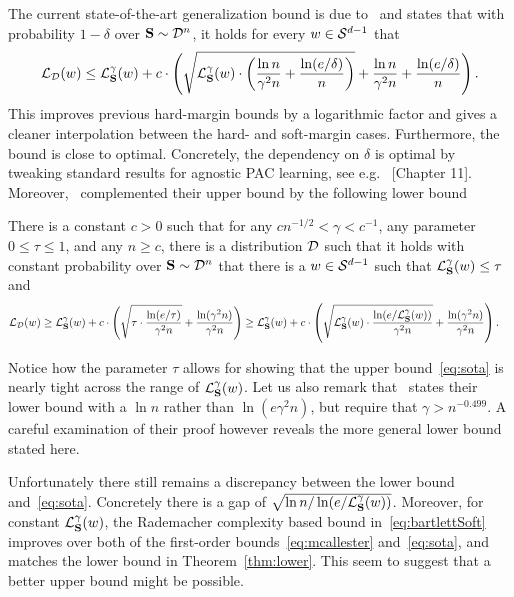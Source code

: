 The current state-of-the-art generalization bound is due to~\cite{SVMbest} and states that with probability $1-\delta$ over $\mathbf{S} \sim \mathcal{D}^n$, it holds for every $w \in \mathcal{S}^{d-1}$ that
\begin{align}
    \mathcal{L}_{\mathcal{D}}(w) \leq \mathcal{L}_{\mathbf{S}}^\gamma(w) + c \cdot \left(\sqrt{\mathcal{L}_{\mathbf{S}}^\gamma(w) \cdot \left(\frac{\ln n}{\gamma^2 n} + \frac{\ln(e/\delta)}{n}\right)} + \frac{\ln n}{\gamma^2 n} + \frac{\ln(e/\delta)}{n}\right).\label{eq:sota}
\end{align}
This improves previous hard-margin bounds by a logarithmic factor and gives a cleaner interpolation between the hard- and soft-margin cases. Furthermore, the bound is close to optimal. Concretely, the dependency on $\delta$ is optimal by tweaking standard results for agnostic PAC learning, see e.g.~\cite{DevroyeGyorfiLugosi1996} [Chapter 11]. Moreover,~\cite{SVMbest} complemented their upper bound by the following lower bound 
\begin{theorem}
\label{thm:lower}
There is a constant $c>0$ such that for any $c n^{-1/2} < \gamma < c^{-1}$, any parameter $0 \leq \tau \leq 1$, and any $n \geq c$, there is a distribution $\mathcal{D}$ such that it holds with constant probability over $\mathbf{S} \sim \mathcal{D}^n$ that there is a $w \in \mathcal{S}^{d-1}$ such that $\mathcal{L}_{\mathbf{S}}^\gamma(w) \leq \tau$ and
\begin{align*}
\mathcal{L}_{\mathcal{D}}(w) &\geq \mathcal{L}_{\mathbf{S}}^\gamma(w) + c \cdot \left(\sqrt{\tau \cdot \frac{\ln(e/\tau)}{\gamma^2 n}} + \frac{\ln(\gamma^2 n)}{\gamma^2 n} \right) 
\geq \mathcal{L}_{\mathbf{S}}^\gamma(w) + c \cdot \left(\sqrt{\mathcal{L}_{\mathbf{S}}^\gamma(w) \cdot \frac{\ln(e/\mathcal{L}_{\mathbf{S}}^\gamma(w))}{\gamma^2 n}} + \frac{\ln(\gamma^2 n)}{\gamma^2 n} \right).
\end{align*}
\end{theorem}
Notice how the parameter $\tau$ allows for showing that the upper bound~\eqref{eq:sota} is nearly tight across the range of $\mathcal{L}_{\mathbf{S}}^\gamma(w)$. Let us also remark that~\cite{SVMbest} states their lower bound with a $\ln n$ rather than $\ln(e \gamma^2 n)$, but require that $\gamma > n^{-0.499}$. A careful examination of their proof however reveals the more general lower bound stated here.

Unfortunately there still remains a discrepancy between the lower bound and~\eqref{eq:sota}. Concretely there is a gap of $\sqrt{\ln n/\ln(e/\mathcal{L}_{\mathbf{S}}^\gamma(w))}$. Moreover, for constant $\mathcal{L}_{\mathbf{S}}^\gamma(w)$, the Rademacher complexity based bound in~\eqref{eq:bartlettSoft} improves over both of the first-order bounds~\eqref{eq:mcallester} and~\eqref{eq:sota}, and matches the lower bound in Theorem~\ref{thm:lower}. This seem to suggest that a better upper bound might be possible.

